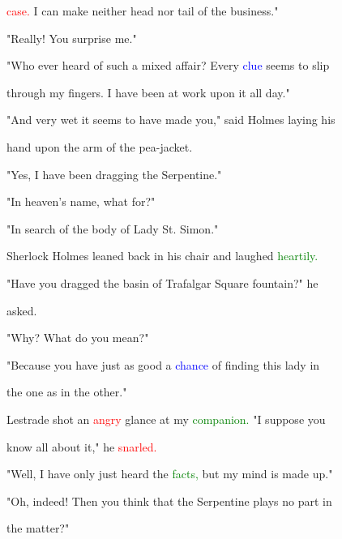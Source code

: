  \textcolor{red}{case.} I can make neither head nor tail of the business."



 "Really! You \textcolor{BurntOrange}{surprise} me."



 "Who ever heard of such a mixed affair? Every \textcolor{blue}{clue} seems to \textcolor{BurntOrange}{slip}

 through my fingers. I have been at work upon it all day."



 "And very wet it seems to have made you," said Holmes laying his

 hand upon the arm of the pea-jacket.



 "Yes, I have been dragging the Serpentine."



 "In heaven's name, what for?"



 "In search of the body of Lady St. Simon."



 Sherlock Holmes leaned back in his chair and \textcolor{BurntOrange}{laughed} \textcolor{green}{heartily.}



 "Have you dragged the basin of Trafalgar Square fountain?" he

 asked.



 "Why? What do you mean?"



 "Because you have just as \textcolor{BurntOrange}{good} a \textcolor{blue}{chance} of finding this lady in

 the one as in the other."



 Lestrade \textcolor{BurntOrange}{shot} an \textcolor{red}{angry} glance at my \textcolor{green}{companion.} "I suppose you

 know all about it," he \textcolor{red}{snarled.}



 "Well, I have only just heard the \textcolor{green}{facts,} but my mind is made up."



 "Oh, indeed! Then you think that the Serpentine plays no part in

 the matter?"



